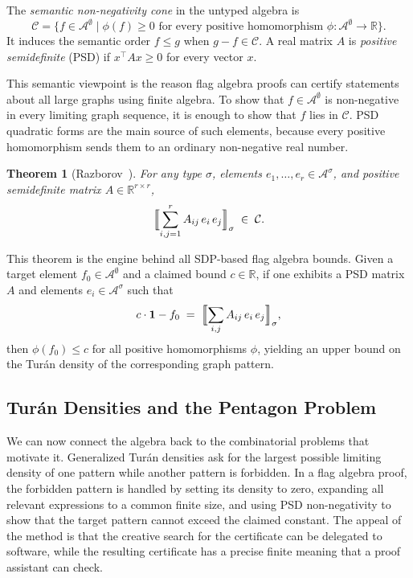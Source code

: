 \documentclass{article}
\newtheorem{theorem}{Theorem}[section]
\begin{document}
The \emph{semantic non-negativity cone} in the untyped algebra is
\[
  \mathcal{C}
  =
  \{f \in \mathcal{A}^\emptyset
    \mid \phi(f) \geq 0
    \text{ for every positive homomorphism }
    \phi:\mathcal{A}^\emptyset\to\mathbb{R}\}.
\]
It induces the semantic order $f\leq g$ when $g-f\in\mathcal{C}$.
A real matrix $A$ is \emph{positive semidefinite} (PSD) if
$x^\top A x\geq 0$ for every vector $x$.

This semantic viewpoint is the reason flag algebra proofs can certify
statements about all large graphs using finite algebra.  To show that
$f\in\mathcal{A}^\emptyset$ is non-negative in every limiting graph sequence,
it is enough to show that $f$ lies in $\mathcal{C}$.  PSD quadratic forms are
the main source of such elements, because every positive homomorphism sends
them to an ordinary non-negative real number.

\begin{theorem}[Razborov~{\cite{razborov2007flag}}]
  \label{thm:sdp-nonneg}
  For any type $\sigma$, elements $e_1,\ldots,e_r \in \mathcal{A}^\sigma$,
  and positive semidefinite matrix $A \in \mathbb{R}^{r\times r}$,
  \[
    \Bigl\llbracket \sum_{i,j=1}^r A_{ij}\, e_i\, e_j \Bigr\rrbracket_\sigma
    \;\in\; \mathcal{C}.
  \]
\end{theorem}

This theorem is the engine behind all SDP-based flag algebra bounds.
Given a target element $f_0 \in \mathcal{A}^\emptyset$ and a claimed bound
$c \in \mathbb{R}$, if one exhibits a PSD matrix $A$ and elements
$e_i \in \mathcal{A}^\sigma$ such that
\[
  c \cdot \mathbf{1} - f_0
  \;=\;
  \Bigl\llbracket \sum_{i,j} A_{ij}\, e_i\, e_j \Bigr\rrbracket_\sigma,
\]
then $\phi(f_0) \leq c$ for all positive homomorphisms $\phi$, yielding an
upper bound on the Turán density of the corresponding graph pattern.

\subsection{Turán Densities and the Pentagon Problem}

We can now connect the algebra back to the combinatorial problems that motivate
it.  Generalized Turán densities ask for the largest possible limiting density
of one pattern while another pattern is forbidden.  In a flag algebra proof,
the forbidden pattern is handled by setting its density to zero, expanding all
relevant expressions to a common finite size, and using PSD non-negativity to
show that the target pattern cannot exceed the claimed constant.  The appeal of
the method is that the creative search for the certificate can be delegated to
software, while the resulting certificate has a precise finite meaning that a
proof assistant can check.
\end{document}
